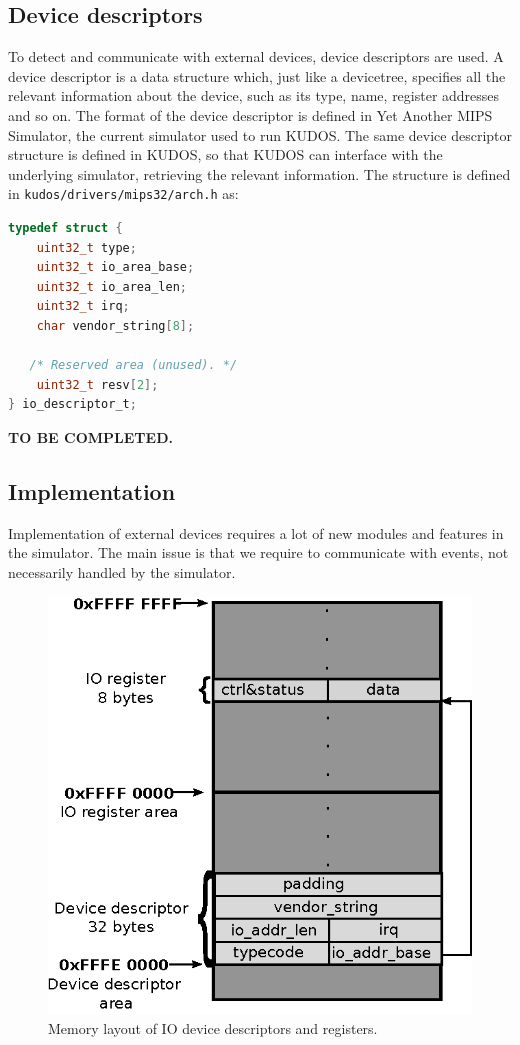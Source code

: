 \subsection{Device descriptors}
To detect and communicate with external devices, device descriptors are used.
A device descriptor is a data structure which, just like a devicetree, specifies
all the relevant information about the device, such as its type, name, register
addresses and so on. The format of the device descriptor is defined in Yet Another
MIPS Simulator, the current simulator used to run KUDOS. The same device descriptor
structure is defined in KUDOS, so that KUDOS can interface with the underlying
simulator, retrieving the relevant information.
The structure is defined in \texttt{kudos/drivers/mips32/arch.h}\cite{kudos} as:
\begin{lstlisting}[language=c]
typedef struct {
    uint32_t type;
    uint32_t io_area_base;
    uint32_t io_area_len;
    uint32_t irq;
    char vendor_string[8];

   /* Reserved area (unused). */
    uint32_t resv[2];
} io_descriptor_t;
\end{lstlisting}

\textbf{TO BE COMPLETED.}


\subsection{Implementation}
Implementation of external devices requires a lot of new modules and features
in the simulator. The main issue is that we require to communicate with
events, not necessarily handled by the simulator.



\begin{figure}[H]
	\centering
	\includegraphics[scale=1]{io/io_memory_layout.eps}
	\caption{Memory layout of IO device descriptors and registers.}
	\label{fig:io_memory_layout}
\end{figure}



